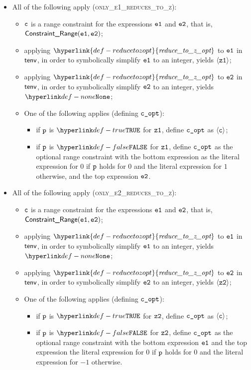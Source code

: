 \documentclass{book}
\newcommand\reducetozopt[0]{\hyperlink{def-reducetozopt}{\textfunc{reduce\_to\_z\_opt}}}
\begin{document}
\begin{itemize}
  \item All of the following apply (\textsc{only\_e1\_reduces\_to\_z}):
  \begin{itemize}
    \item $\texttt{c}$ is a range constraint for the expressions $\texttt{e1}$ and $\texttt{e2}$, that is, \\
          $\textsf{Constraint\_Range}(\texttt{e1}, \texttt{e2})$;
    \item applying $\reducetozopt$ to $\texttt{e1}$ in $\textsf{tenv}$, in order to symbolically simplify $\texttt{e1}$ to an integer,
          yields $\langle\texttt{z1}\rangle$;
    \item applying $\reducetozopt$ to $\texttt{e2}$ in $\textsf{tenv}$, in order to symbolically simplify $\texttt{e2}$ to an integer,
          yields $\None$;
    \item One of the following applies (defining $\texttt{c\_opt}$):
    \begin{itemize}
      \item if $\texttt{p}$ is $\True$ for $\texttt{z1}$, define $\texttt{c\_opt}$ as $\langle\texttt{c}\rangle$;
      \item if $\texttt{p}$ is $\False$ for $\texttt{z1}$, define $\texttt{c\_opt}$ as the optional range constraint with the bottom expression
            as the literal expression for $0$ if $\texttt{p}$ holds for $0$ and the literal expression for $1$ otherwise,
            and the top expression $\texttt{e2}$.
    \end{itemize}
  \end{itemize}

  \item All of the following apply (\textsc{only\_e2\_reduces\_to\_z}):
  \begin{itemize}
    \item $\texttt{c}$ is a range constraint for the expressions $\texttt{e1}$ and $\texttt{e2}$, that is, \\
          $\textsf{Constraint\_Range}(\texttt{e1}, \texttt{e2})$;
    \item applying $\reducetozopt$ to $\texttt{e1}$ in $\textsf{tenv}$, in order to symbolically simplify $\texttt{e1}$ to an integer,
          yields $\None$;
    \item applying $\reducetozopt$ to $\texttt{e2}$ in $\textsf{tenv}$, in order to symbolically simplify $\texttt{e2}$ to an integer,
          yields $\langle\texttt{z2}\rangle$;
    \item One of the following applies (defining $\texttt{c\_opt}$):
    \begin{itemize}
      \item if $\texttt{p}$ is $\True$ for $\texttt{z2}$, define $\texttt{c\_opt}$ as $\langle\texttt{c}\rangle$;
      \item if $\texttt{p}$ is $\False$ for $\texttt{z2}$, define $\texttt{c\_opt}$ as the optional range constraint with the bottom expression
            $\texttt{e1}$ and the top expression the literal expression for $0$ if $\texttt{p}$ holds for $0$ and the literal expression for $-1$ otherwise.
    \end{itemize}
  \end{itemize}
\end{itemize}
\end{document}
